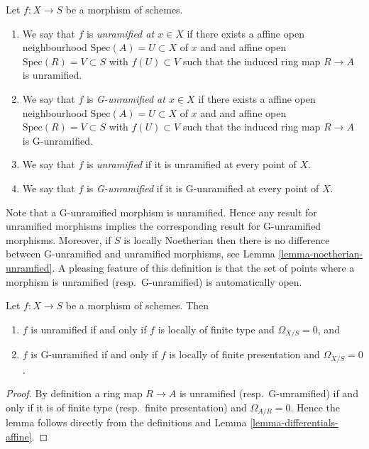 \begin{definition}
\label{definition-unramified}
Let $f : X \to S$ be a morphism of schemes.
\begin{enumerate}
\item We say that $f$ is {\it unramified at $x \in X$} if
there exists a affine open neighbourhood $\text{Spec}(A) = U \subset X$
of $x$ and and affine open $\text{Spec}(R) = V \subset S$
with $f(U) \subset V$ such that the induced ring map
$R \to A$ is unramified.
\item We say that $f$ is {\it G-unramified at $x \in X$} if
there exists a affine open neighbourhood $\text{Spec}(A) = U \subset X$
of $x$ and and affine open $\text{Spec}(R) = V \subset S$
with $f(U) \subset V$ such that the induced ring map
$R \to A$ is G-unramified.
\item We say that $f$ is {\it unramified} if it is unramified
at every point of $X$.
\item We say that $f$ is {\it G-unramified} if it is G-unramified
at every point of $X$.
\end{enumerate}
\end{definition}

\noindent
Note that a G-unramified morphism is unramified. Hence any result for
unramified morphisms implies the corresponding result for G-unramified
morphisms. Moreover, if $S$ is locally Noetherian then there is no difference
between G-unramified and unramified morphisms, see
Lemma \ref{lemma-noetherian-unramfied}.
A pleasing feature of this definition is that the set of points
where a morphism is unramified (resp.\ G-unramified) is automatically open.

\begin{lemma}
\label{lemma-unramified-omega-zero}
Let $f : X \to S$ be a morphism of schemes. Then
\begin{enumerate}
\item $f$ is unramified if and only if $f$ is locally of finite type
and $\Omega_{X/S} = 0$, and
\item $f$ is G-unramified if and only if $f$ is locally of finite presentation
and $\Omega_{X/S} = 0$.
\end{enumerate}
\end{lemma}

\begin{proof}
By definition a ring map $R \to A$ is unramified (resp.\ G-unramified)
if and only if it is of finite type (resp.\ finite presentation)
and $\Omega_{A/R} = 0$. Hence the lemma follows
directly from the definitions and Lemma \ref{lemma-differentials-affine}.
\end{proof}

